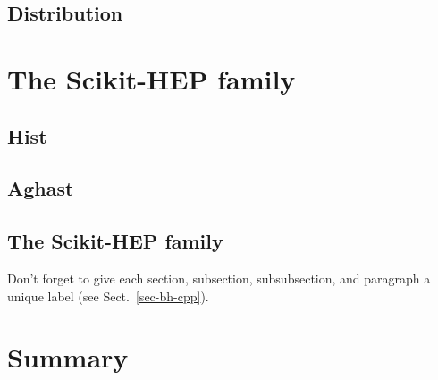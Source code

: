 \documentclass{webofc}
\begin{document}
\subsection{Distribution}

\section{The Scikit-HEP family}
\label{sec-3}

\subsection{Hist}
\subsection{Aghast}
\subsection{The Scikit-HEP family}

Don't forget to give each section, subsection, subsubsection, and
paragraph a unique label (see Sect.~\ref{sec-bh-cpp}).

\section{Summary}
\label{sec-4}

% 
\end{document}
